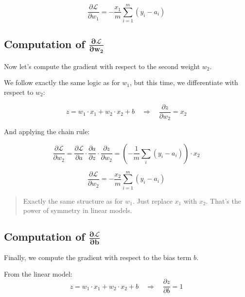 \documentclass[11pt]{article}
\begin{document}
\vspace{1em}

\begin{tcolorbox}[colback=gray!5, colframe=gray!60!black, title=Gradient of $\mathcal{L}$ with respect to $w_1$]
\[
\boxed{ \frac{\partial \mathcal{L}}{\partial w_1} = -\frac{x_1}{m} \sum_{i=1}^{m} (y_i - a_i) }
\]
\end{tcolorbox}

\vspace{1em}

\subsection*{Computation of $\boldsymbol{\frac{\partial \mathcal{L}}{\partial w_2}}$}

Now let's compute the gradient with respect to the second weight $w_2$.

We follow exactly the same logic as for $w_1$, but this time, we differentiate with respect to $w_2$:

\[
z = w_1 \cdot x_1 + w_2 \cdot x_2 + b
\quad \Rightarrow \quad
\frac{\partial z}{\partial w_2} = x_2
\]

And applying the chain rule:

\[
\frac{\partial \mathcal{L}}{\partial w_2} 
= \frac{\partial \mathcal{L}}{\partial a} \cdot \frac{\partial a}{\partial z} \cdot \frac{\partial z}{\partial w_2}
= \left( -\frac{1}{m} \sum_i (y_i - a_i) \right) \cdot x_2
\]

\begin{tcolorbox}[colback=gray!5, colframe=gray!60!black, title=Gradient of $\mathcal{L}$ with respect to $w_2$]
\[
\boxed{ \frac{\partial \mathcal{L}}{\partial w_2} = -\frac{x_2}{m} \sum_{i=1}^{m} (y_i - a_i) }
\]
\end{tcolorbox}

\begin{quote}
Exactly the same structure as for $w_1$. Just replace $x_1$ with $x_2$. That's the power of symmetry in linear models.
\end{quote}

\subsection*{Computation of $\boldsymbol{\frac{\partial \mathcal{L}}{\partial b}}$}

Finally, we compute the gradient with respect to the bias term $b$.

From the linear model:
\[
z = w_1 \cdot x_1 + w_2 \cdot x_2 + b
\quad \Rightarrow \quad
\frac{\partial z}{\partial b} = 1
\]
\end{document}
